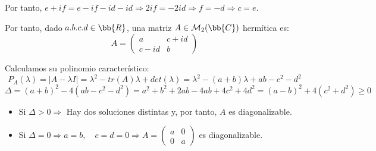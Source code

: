 \begin{ejercicio}
\begin{enumerate}
        Por tanto, $e+if = e-if -id -id \Longrightarrow 2if = -2id \Longrightarrow f=-d \Longrightarrow c=e$.

        Por tanto, dado $a.b.c.d \in \bb{R}$, una matriz $A\in \mathcal{M}_2(\bb{C})$ hermítica es:
        \begin{equation*}
            A=\left(\begin{array}{cc}
            a & c+id \\
            c-id & b
        \end{array}\right)
        \end{equation*}

        Calculamos su polinomio característico:
        \begin{equation*}
            P_A(\lambda) = |A-\lambda I| = \lambda^2 - tr(A)\lambda + det(\lambda) = \lambda^2 -(a+b)\lambda + ab-c^2-d^2
        \end{equation*}
        $$\Delta = (a+b)^2 -4(ab-c^2 - d^2) = a^2+b^2+2ab -4ab +4c^2 +4d^2 = (a-b)^2 +4(c^2+d^2) \geq 0$$

        \begin{itemize}
            \item Si $\Delta > 0 \Longrightarrow$ 
            Hay dos soluciones distintas y, por tanto, $A$ es diagonalizable.

            \item Si $\Delta = 0 \Longrightarrow a=b, \quad  c=d=0 \Longrightarrow A=\left(\begin{array}{cc}
            a & 0 \\
            0 & a
        \end{array}\right)$ es diagonalizable.
        \end{itemize}
    \end{enumerate}
\end{ejercicio}


